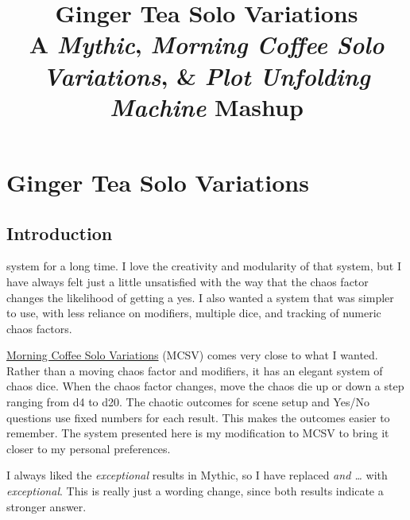 

\title{
\Huge{Ginger Tea Solo Variations}
\\ \small{A \emph{Mythic}, \emph{Morning Coffee Solo Variations}, \& \emph{Plot Unfolding Machine} Mashup}
}


\frontmatter

\mainmatter

\chapter*{Ginger Tea Solo Variations \version}
\section{Introduction}
system for a long time. I love the creativity and modularity of that system,
but I have always felt just a little unsatisfied with the way that the chaos
factor changes the likelihood of getting a yes. I also wanted a system
that was simpler to use, with less reliance on modifiers, multiple dice, and
tracking of numeric chaos factors.

\href{https://aleaiactandaest.blogspot.com/p/downloads.html}{Morning Coffee Solo
Variations} (MCSV) comes very close to what I wanted. Rather than a moving chaos
factor and modifiers, it has an elegant system of chaos dice. When the chaos
factor changes, move the chaos die up or down a step ranging from d4 to d20. The
chaotic outcomes for scene setup and Yes/No questions use fixed numbers for each
result. This makes the outcomes easier to remember. The system presented here is
my modification to MCSV to bring it closer to my personal preferences.

I always liked the \emph{exceptional} results in Mythic, so I have replaced
\emph{and \ldots} with \emph{exceptional}. This is really just a wording change,
since both results indicate a stronger answer.

